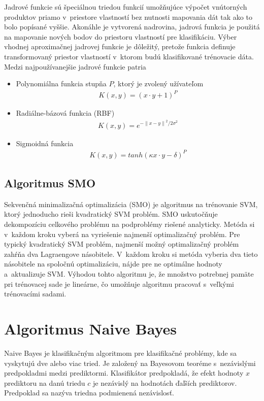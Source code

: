 Jadrové funkcie sú špeciálnou triedou funkcií umožňujúce výpočet vnútorných produktov priamo v~priestore vlastností bez nutnosti mapovania dát tak ako to bolo popísané vyššie. 
Akonáhle je vytvorená nadrovina, jadrová funkcia je použitá na mapovanie nových bodov do priestoru vlastností pre klasifikáciu.
\newpage
Výber vhodnej aproximačnej jadrovej funkcie je dôležitý, pretože funkcia definuje transformovaný priestor vlastností v~ktorom budú klasifikované trénovacie dáta. Medzi najpoužívanejšie jadrové funkcie patria
\begin{itemize}
	\item Polynomiálna funkcia stupňa $P$, ktorý je zvolený užívateľom
	\begin{align}
		 K(x,y) = (x \cdot y + 1)^{P}
	\end{align} 
	\item Radiálne-bázová funkcia (RBF) 
	\begin{align}
		K(x,y) = e^{- {\parallel x - y \parallel}^{2}/ {2\sigma}^{2}}
	\end{align}
	\item Sigmoidná funkcia
	\begin{align}
		K(x,y) = tanh (\kappa x \cdot y -\delta)^{P}
	\end{align}
\end{itemize}


\subsection{Algoritmus SMO}

Sekvenčná minimalizačná optimalizácia (SMO) je algoritmus na trénovanie SVM, ktorý jednoducho rieši kvadratický SVM problém. SMO uskutočňuje dekompozíciu celkového problému na podproblémy riešené analyticky. Metóda si v~každom kroku vyberá na vyriešenie najmenší optimalizačný problém. Pre typický kvadratický SVM problém, najmenší možný optimalizačný problém zahŕňa dva Lagraengove násobitele. V~každom kroku si metóda vyberia dva tieto násobitele na spoločnú optimalizáciu, nájde pre ne optimálne hodnoty a~aktualizuje SVM. Výhodou tohto algoritmu je, že množstvo potrebnej pamäte pri trénovacej sade je lineárne, čo umožňuje algoritmu pracovať s~veľkými trénovacími sadami. 
 
\section{Algoritmus Naive Bayes}

Naive Bayes je klasifikačným algoritmom pre klasifikačné problémy, kde sa vyskytujú dve alebo viac tried. Je založený na Bayesovom teoréme s~nezávislými predpokladmi medzi prediktormi. Klasifikátor predpokladá, že efekt hodnoty $x$ prediktoru na danú triedu $c$ je nezávislý na hodnotách ďaľších prediktorov. Predpoklad sa nazýva triedna podmienená nezávislosť. 

